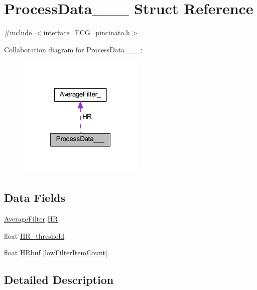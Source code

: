\hypertarget{struct_process_data______}{}\section{Process\+Data\+\_\+\+\_\+\+\_\+ Struct Reference}
\label{struct_process_data______}


{\ttfamily \#include $<$interface\+\_\+\+E\+C\+G\+\_\+pincinato.\+h$>$}



Collaboration diagram for Process\+Data\+\_\+\+\_\+\+\_\+\+:\nopagebreak
\begin{figure}[H]
\begin{center}
\leavevmode
\includegraphics[width=169pt]{struct_process_data________coll__graph}
\end{center}
\end{figure}
\subsection*{Data Fields}
\begin{DoxyCompactItemize}
\item 
\mbox{\hyperlink{filter__math__pincinato_8h_a05751bcbb0782121ff05ae3b7fc37dac}{Average\+Filter}} \mbox{\hyperlink{struct_process_data_______afa7d4c3f6f59fcc62e758b829d298569}{HR}}
\item 
float \mbox{\hyperlink{struct_process_data_______aa85aa87ff25601cf758c39958653d60a}{H\+R\+\_\+threshold}}
\item 
float \mbox{\hyperlink{struct_process_data_______abe41d3213d4f1e10d1ce88c78db23a22}{H\+Rbuf}} \mbox{[}\mbox{\hyperlink{interface___e_c_g__pincinato_8h_aa57c4fd3ea06cc9a9c4e8ecda369ed58}{low\+Filter\+Item\+Count}}\mbox{]}
\end{DoxyCompactItemize}


\subsection{Detailed Description}


